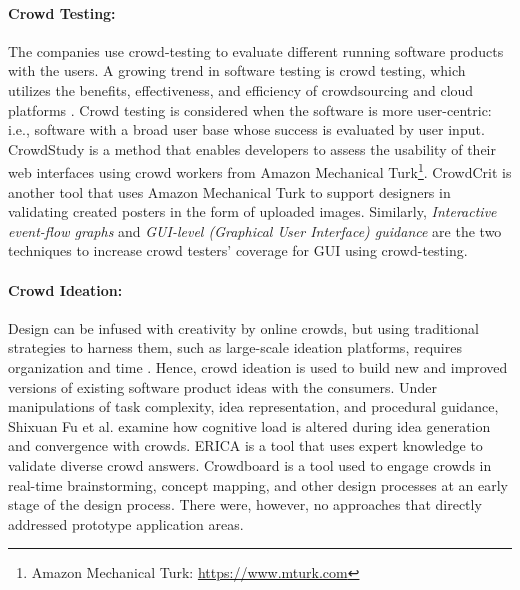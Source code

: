\paragraph{Crowd Testing:}
The companies use crowd-testing to evaluate different running software products with the users.
A growing trend in software testing is crowd testing, which utilizes the benefits, effectiveness, and efficiency of crowdsourcing and cloud platforms \cite{article:crowdsourcing:latoza}.
Crowd testing is considered when the software is more user-centric: i.e., software with a broad user base whose success is evaluated by user input.
CrowdStudy \cite{article:crowdsourcing:nebeling} is a method that enables developers to assess the usability of their web interfaces using crowd workers from Amazon Mechanical Turk\footnote{Amazon Mechanical Turk: \url{https://www.mturk.com}}.
CrowdCrit \cite{article:crowdsourcing:luther} is another tool that uses Amazon Mechanical Turk to support designers in validating created posters in the form of uploaded images.
Similarly, \textit{Interactive event-flow graphs} and \textit{GUI-level (Graphical User Interface) guidance} \cite{article:crowdsourcing:chen} are the two techniques to increase crowd testers' coverage for GUI using crowd-testing.

\paragraph{Crowd Ideation:}
Design can be infused with creativity by online crowds, but using traditional strategies to harness them, such as large-scale ideation platforms, requires organization and time \cite{article:crowdsourcing:andolina}.
Hence, crowd ideation is used to build new and improved versions of existing software product ideas with the consumers.
Under manipulations of task complexity, idea representation, and procedural guidance, Shixuan Fu et al. \cite{article:crowdsourcing:fu} examine how cognitive load is altered during idea generation and convergence with crowds.
ERICA \cite{article:crowdsourcing:erica} is a tool that uses expert knowledge to validate diverse crowd answers.
Crowdboard \cite{article:crowdsourcing:andolina} is a tool used to engage crowds in real-time brainstorming, concept mapping, and other design processes at an early stage of the design process.
There were, however, no approaches that directly addressed prototype application areas.

